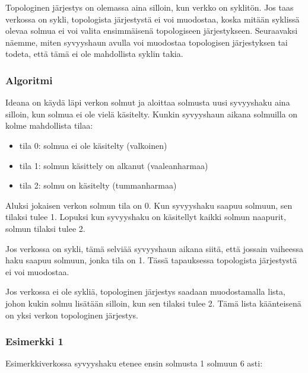 Topologinen järjestys on olemassa
aina silloin, kun verkko on syklitön.
Jos taas verkossa on sykli,
topologista järjestystä ei voi muodostaa,
koska mitään syklissä olevaa solmua ei voi
valita ensimmäisenä topologiseen järjestykseen.
Seuraavaksi näemme, miten syvyyshaun avulla
voi muodostaa topologisen järjestyksen tai
todeta, että tämä ei ole mahdollista syklin takia.

\subsubsection{Algoritmi}

Ideana on käydä läpi verkon solmut ja aloittaa
solmusta uusi syvyyshaku aina silloin, kun solmua
ei ole vielä käsitelty.
Kunkin syvyyshaun aikana solmuilla on
kolme mahdollista tilaa:

\begin{itemize}
\item tila 0: solmua ei ole käsitelty (valkoinen)
\item tila 1: solmun käsittely on alkanut (vaaleanharmaa)
\item tila 2: solmu on käsitelty (tummanharmaa)
\end{itemize}

Aluksi jokaisen verkon solmun tila on 0.
Kun syvyyshaku saapuu solmuun, sen tilaksi tulee 1.
Lopuksi kun syvyyshaku on käsitellyt kaikki
solmun naapurit, solmun tilaksi tulee 2.

Jos verkossa on sykli, tämä selviää syvyyshaun aikana siitä,
että jossain vaiheessa haku saapuu solmuun,
jonka tila on 1. Tässä tapauksessa topologista
järjestystä ei voi muodostaa.

Jos verkossa ei ole sykliä, topologinen järjestys
saadaan muodostamalla lista, johon kukin solmu lisätään
silloin, kun sen tilaksi tulee 2.
Tämä lista käänteisenä on yksi verkon
topologinen järjestys.

\subsubsection{Esimerkki 1}

Esimerkkiverkossa syvyyshaku etenee ensin solmusta 1
solmuun 6 asti:

\begin{center}
\end{center}

